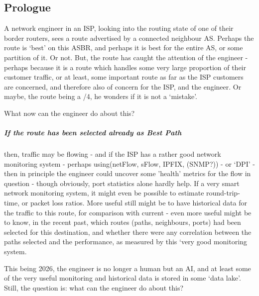 \subsection{Prologue}

A network engineer in an ISP, looking into the routing state of one of their
border routers, sees a route advertised by a connected neighbour AS.  Perhaps
the route is `best' on this ASBR, and perhaps it is best for the entire AS, or
some partition of it.  Or not.	But, the route has caught the attention of the
engineer - perhaps because it is a route which handles some very large
proportion of their customer traffic, or at least, some important route as far
as the ISP customers are concerned, and therefore also of concern for the ISP, and the engineer.
Or maybe, the route being a /4, he wonders if it is not a `mistake'.

What now can the engineer do about this?

\subparagraph{If the route has been selected already as Best Path}
then, traffic may be flowing - and if the ISP has
a rather good network monitoring system - perhaps using(netFlow, sFlow, IPFIX,
(SNMP?)) - or `DPI' - then in principle the engineer could uncover some
'health' metrics for the flow in question - though obviously, port statistics alone
hardly help.  If a very smart network monitoring system, it might even be
possible to estimate round-trip-time, or packet loss ratios.  More useful still
might be to have historical data for the traffic to this route, for comparison
with current - even more useful might be to know, in the recent past, which
routes (paths, neighbours, ports) had been selected for this destination, and
whether there were any correlation between the paths selected and the
performance, as measured by this `very good monitoring system.

This being 2026, the engineer is no longer a human but an AI, and at least some
of the very useful monitoring and historical data is stored in some `data
lake'.
Still, the question is: what can the engineer do about this?

